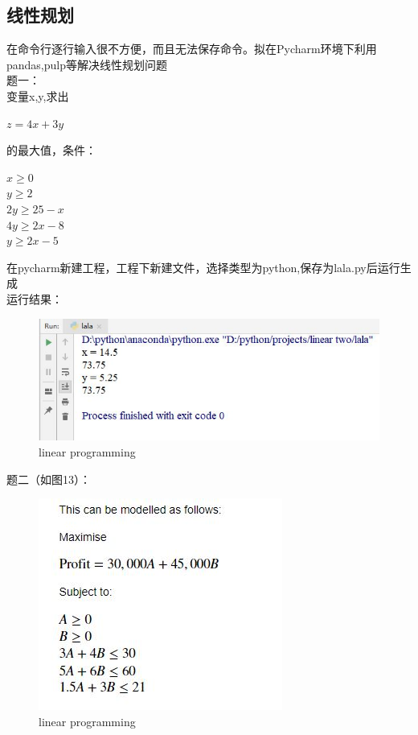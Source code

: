 \documentclass[UTF8]{ctexart}
\begin{document}
\subsection{线性规划}
在命令行逐行输入很不方便，而且无法保存命令。拟在Pycharm环境下利用pandas,pulp等解决线性规划问题\\
题一：\\
变量x,y,求出\\
\centerline{$z=4x+3y$}
的最大值，条件：\\
\begin{center}
$x\geq0$\\
$y\geq2$\\
$2y\geq25-x$\\
$4y\geq2x-8$\\
$y\geq2x-5$\\
\end{center}
在pycharm新建工程，工程下新建文件，选择类型为python,保存为lala.py后运行生成\\
运行结果：\\
\begin{figure}
  \includegraphics[width=.8\linewidth]{lala.JPG}
  \caption{linear programming}
  \label{fig:boat1}
\end{figure}
题二（如图13）：
\begin{figure}
  \includegraphics[width=.8\linewidth]{resourcepro.JPG}
  \caption{linear programming}
  \label{fig:boat1}
\end{figure}
\end{document}

